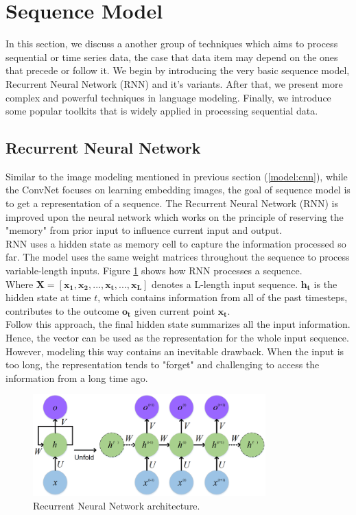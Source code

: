 \section{Sequence Model}
In this section, we discuss a another group of techniques which aims to process sequential or time series data, the case that data item may depend on the ones that precede or follow it. 
We begin by introducing the very basic sequence model, Recurrent Neural Network (RNN) and it's variants. After that, we present more complex and powerful techniques in language modeling. Finally, we introduce some popular toolkits that is widely applied in processing sequential data.
\subsection{Recurrent Neural Network}
Similar to the image modeling mentioned in previous section (\ref{model:cnn}), while the ConvNet focuses on learning embedding images, the goal of sequence model is to get a representation of a sequence. 
The Recurrent Neural Network (RNN) is improved upon the neural network which works on the principle of reserving the "memory" from prior input to influence current input and output. \\
RNN uses a hidden state as memory cell to capture the information processed so far. The model uses the same weight matrices throughout the sequence to process variable-length inputs.
Figure \ref{fig:rnn} shows how RNN processes a sequence. \\
Where $\mathbf{X} = [\mathbf{x_{1}}, \mathbf{x_{2}}, ..., \mathbf{x_{t}}, ..., \mathbf{x_{L}}]$ denotes a L-length input sequence. $\mathbf{h_{t}}$ is the hidden state at time $t$, which contains information from all of the past timesteps, contributes to the outcome $\mathbf{o_{t}}$ given current point $\mathbf{x_{t}}$. \\
Follow this approach, the final hidden state summarizes all the input information. Hence, the vector can be used as the representation for the whole input sequence. 
However, modeling this way contains an inevitable drawback. When the input is too long, the representation tends to "forget" and challenging to access the information from a long time ago.
\begin{figure}[t!]
    \centering
    \includegraphics[width=0.8\textwidth]{images/RNN.png}
    \caption{Recurrent Neural Network architecture.}
    \label{fig:rnn}
\end{figure}
